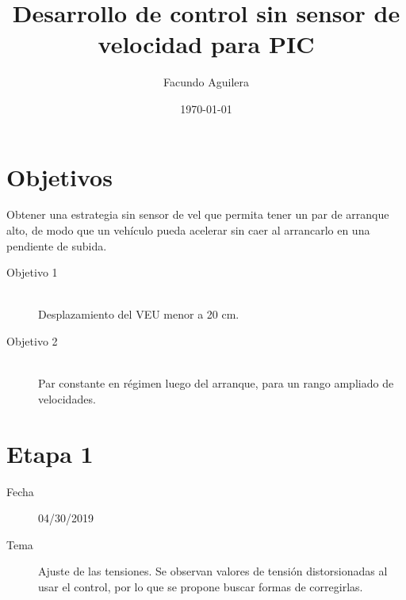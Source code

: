 \documentclass{article}
\title{Desarrollo de control sin sensor de velocidad para PIC} %
\author{Facundo Aguilera} %
\date{\today} %
\begin{document}
	
	\maketitle 
	

	
	
	\section{Objetivos}
	

	
	
	Obtener una estrategia sin sensor de vel que permita tener un par de arranque alto, de modo que un vehículo pueda acelerar sin caer al arrancarlo en una pendiente de subida.
	
	
	\begin{description}
	\item[Objetivo 1] \hfill \\
	Desplazamiento del VEU menor a 20 cm.
	\item[Objetivo 2] \hfill \\
	Par constante en régimen luego del arranque, para un rango ampliado de velocidades.
	\end{description}
	

	
	
	\section{Etapa 1}
	
	\begin{description}
		\item[Fecha]  04/30/2019 
		\item[Tema] Ajuste de las tensiones. Se observan valores de tensión distorsionadas al usar el control, por lo que se propone buscar formas de corregirlas.
	\end{description}
\end{document}
